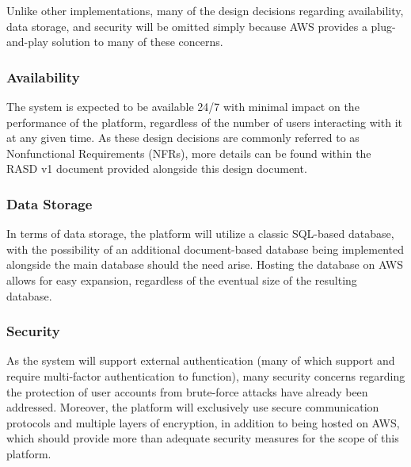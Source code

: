Unlike other implementations, many of the design decisions regarding availability, data storage, and security will be omitted simply because AWS provides a plug-and-play solution to many of these concerns.

\subsubsection{Availability}
The system is expected to be available 24/7 with minimal impact on the performance of the platform, regardless of the number of users interacting with it at any given time. As these design decisions are commonly referred to as Nonfunctional Requirements (NFRs), more details can be found within the RASD v1 document provided alongside this design document.

\subsubsection{Data Storage}
In terms of data storage, the platform will utilize a classic SQL-based database, with the possibility of an additional document-based database being implemented alongside the main database should the need arise. Hosting the database on AWS allows for easy expansion, regardless of the eventual size of the resulting database.

\subsubsection{Security}
As the system will support external authentication (many of which support and require multi-factor authentication to function), many security concerns regarding the protection of user accounts from brute-force attacks have already been addressed. Moreover, the platform will exclusively use secure communication protocols and multiple layers of encryption, in addition to being hosted on AWS, which should provide more than adequate security measures for the scope of this platform.